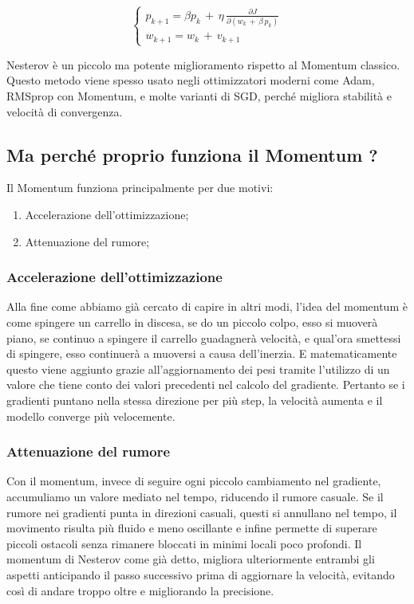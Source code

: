 \begin{equation}
\left\{\begin{array}{c}
    p_{k+1} = \beta p_k\,+\,\eta\,\frac{\partial J}{\partial(w_k\,+\,\beta\,p_k)}\\
    w_{k+1} = w_k\,+\,v_{k+1}
    \end{array}\right.
\end{equation}

Nesterov è un piccolo ma potente miglioramento rispetto al Momentum classico. Questo metodo viene spesso usato negli ottimizzatori moderni come Adam, RMSprop con Momentum, e molte varianti di SGD, perché migliora stabilità e velocità di convergenza.

\subsection{Ma perché proprio funziona il Momentum ?}
Il Momentum funziona principalmente per due motivi:
\begin{enumerate}
    \item Accelerazione dell'ottimizzazione;
    \item Attenuazione del rumore;
\end{enumerate}

\subsubsection{Accelerazione dell'ottimizzazione}
Alla fine come abbiamo già cercato di capire in altri modi, l'idea del momentum è come spingere un carrello in discesa, se do un piccolo colpo, esso si muoverà piano, se continuo a spingere il carrello guadagnerà velocità, e qual'ora smettessi di spingere, esso continuerà a muoversi a causa dell'inerzia. E matematicamente questo viene aggiunto grazie all'aggiornamento dei pesi tramite l'utilizzo di un valore che tiene conto dei valori precedenti nel calcolo del gradiente. Pertanto se i gradienti puntano nella stessa direzione per più step, la velocità aumenta e il modello converge più velocemente.
\subsubsection{Attenuazione del rumore}
Con il momentum, invece di seguire ogni piccolo cambiamento nel gradiente, accumuliamo un valore mediato nel tempo, riducendo il rumore casuale. Se il rumore nei gradienti punta in direzioni casuali, questi si annullano nel tempo, il movimento risulta più fluido e meno oscillante e infine permette di superare piccoli ostacoli senza rimanere bloccati in minimi locali poco profondi. Il momentum di Nesterov come già detto, migliora ulteriormente entrambi gli aspetti anticipando il passo successivo prima di aggiornare la velocità, evitando così di andare troppo oltre e migliorando la precisione.

